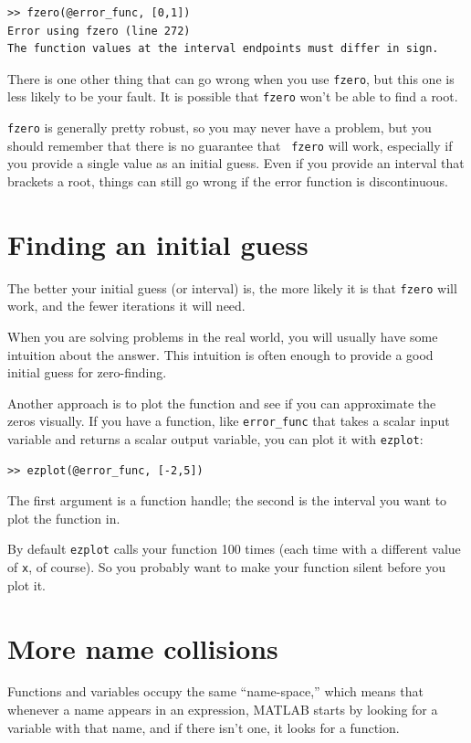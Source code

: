 \documentclass{book}
\begin{document}
\begin{verbatim}
>> fzero(@error_func, [0,1])
Error using fzero (line 272)
The function values at the interval endpoints must differ in sign.
\end{verbatim}

There is one other thing that can go wrong when you use {\tt fzero}, but
this one is less likely to be your fault.  It is possible that {\tt fzero}
won't be able to find a root.

{\tt fzero} is generally pretty robust, so you may never have a
problem, but you should remember that there is no guarantee that {\tt
fzero} will work, especially if you provide a single value as an
initial guess.  Even if you provide an interval that brackets a root,
things can still go wrong if the error function is discontinuous.


\section{Finding an initial guess}

The better your initial guess (or interval) is, the more likely
it is that {\tt fzero} will work, and the fewer iterations it will
need.

When you are solving problems in the real world, you will usually
have some intuition about the answer.  This intuition is often enough
to provide a good initial guess for zero-finding.

Another approach is to plot the function and see if you can
approximate the zeros visually.  If you have a function, like
{\tt error\_func} that takes a scalar input variable and returns
a scalar output variable, you can plot it with {\tt ezplot}:

\begin{verbatim}
>> ezplot(@error_func, [-2,5])
\end{verbatim}

The first argument is a function handle; the second is the 
interval you want to plot the function in.

By default {\tt ezplot} calls your function 100 times (each time
with a different value of {\tt x}, of course).  So you probably want
to make your function silent before you plot it.

\section{More name collisions}

Functions and variables occupy the same ``name-space,'' which means
that whenever a name appears in an expression, MATLAB starts by looking
for a variable with that name, and if there isn't one, it looks for
a function.
\end{document}
